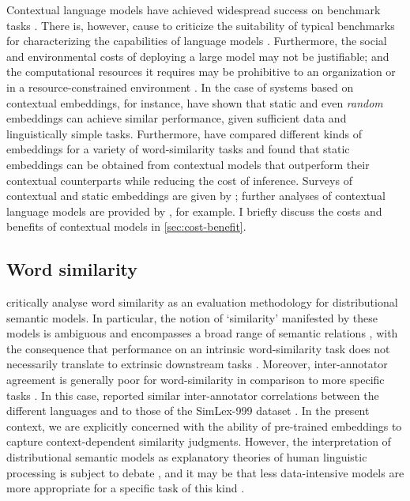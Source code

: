 Contextual language models have achieved widespread success on benchmark tasks
\parencite[22-27]{Bommasani2022}.
There is, however, cause to criticize the suitability of typical benchmarks for
characterizing the capabilities of language models \parencite[5-6]{Srivastava2023}.
Furthermore, the social and environmental costs of deploying a large model may not be
justifiable; and the computational resources it requires may be prohibitive to an
organization or in a resource-constrained environment
\parencite[142-145,154]{Bommasani2022}.
In the case of systems based on contextual embeddings, for instance,
\textcite{Arora2020} have shown that static and even \emph{random} embeddings can
achieve similar performance, given sufficient data and linguistically simple tasks.
Furthermore, \textcites[5244-5246]{Gupta2019}[4760-4762]{Bommasani2020} have compared
different kinds of embeddings for a variety of word-similarity tasks and found that
static embeddings can be obtained from contextual models that outperform their
contextual counterparts while reducing the cost of inference.
Surveys of contextual and static embeddings are given by
\textcites{Liu2020}{Torregrossa2021}; further analyses of contextual language models
are provided by \textcites{Reif2019}{Brunner2019}, for example.
I briefly discuss the costs and benefits of contextual models in
\cref{sec:cost-benefit}.

\subsection{Word similarity}

\textcite{Batchkarov2016} critically analyse word similarity as an evaluation
methodology for distributional semantic models.
In particular, the notion of `similarity' manifested by these models is ambiguous
\parencite{Elekes2020} and encompasses a broad range of semantic relations
\parencite[2]{Pado2003}, with the consequence that performance on an intrinsic
word-similarity task does not necessarily translate to extrinsic downstream tasks
\parencite[7-8]{Batchkarov2016}.
Moreover, inter-annotator agreement is generally poor for word-similarity in comparison
to more specific tasks \parencite[8-9]{Batchkarov2016}.
In this case, \textcites[8]{Armendariz2020}[42]{Armendariz2020a} reported similar
inter-annotator correlations between the different languages and to those of the
SimLex-999 dataset \parencite[678-680]{Hill2015}.
In the present context, we are explicitly concerned with the ability of pre-trained
embeddings to capture context-dependent similarity judgments.
However, the interpretation of distributional semantic models as explanatory theories
of human linguistic processing is subject to debate \parencite{Gunther2019}, and it may
be that less data-intensive models are more appropriate for a specific task of this
kind \parencite{DeDeyne2016}.

